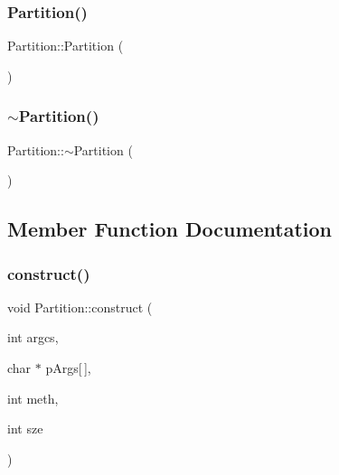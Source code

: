 \mbox{\label{classPartition_aa8a055cfc129cee2a2ef024556fb6c0d}} 
\subsubsection{\texorpdfstring{Partition()}{Partition()}\hspace{0.1cm}{\footnotesize\ttfamily [2/2]}}
{\footnotesize\ttfamily Partition\+::\+Partition (\begin{DoxyParamCaption}{ }\end{DoxyParamCaption})\hspace{0.3cm}{\ttfamily [inline]}}

\mbox{\label{classPartition_a4d134cb81c72c674b162a0d21dbaabfb}} 
\subsubsection{\texorpdfstring{$\sim$\+Partition()}{~Partition()}}
{\footnotesize\ttfamily Partition\+::$\sim$\+Partition (\begin{DoxyParamCaption}{ }\end{DoxyParamCaption})}



\subsection{Member Function Documentation}
\mbox{\label{classPartition_a26c1692ea81e7cf1129dac8e82b9fd38}} 
\subsubsection{\texorpdfstring{construct()}{construct()}}
{\footnotesize\ttfamily void Partition\+::construct (\begin{DoxyParamCaption}\item[{int}]{argcs,  }\item[{char $\ast$}]{p\+Args\mbox{[}$\,$\mbox{]},  }\item[{int}]{meth,  }\item[{int}]{sze }\end{DoxyParamCaption})}

